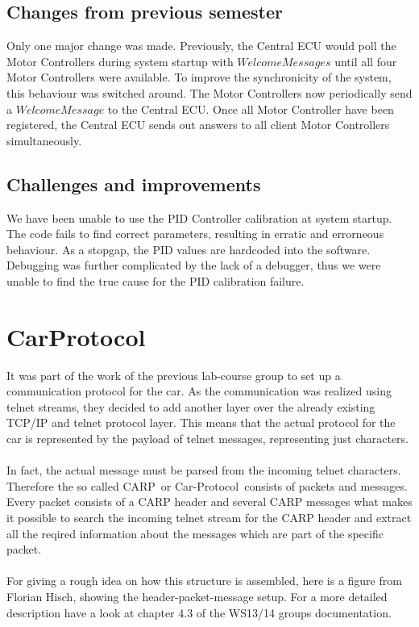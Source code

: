\subsection{Changes from previous semester}
Only one major change was made. Previously, the Central ECU would poll the Motor Controllers during system startup with $WelcomeMessages$ until all four Motor Controllers were available. To improve the synchronicity of the system, this behaviour was switched around. The Motor Controllers now periodically send a $WelcomeMessage$ to the Central ECU. Once all Motor Controller have been registered, the Central ECU sends out answers to all client Motor Controllers simultaneously.

\subsection{Challenges and improvements}
We have been unable to use the PID Controller calibration at system startup. The code fails to find correct parameters, resulting in erratic and errorneous behaviour. As a stopgap, the PID values are hardcoded into the software. Debugging was further complicated by the lack of a debugger, thus we were unable to find the true cause for the PID calibration failure.


\section{CarProtocol}
It was part of the work of the previous lab-course group to set up a communication protocol for the car. As the communication was realized using telnet streams, they decided to add another layer over the already existing TCP/IP and telnet protocol layer. This means that the actual protocol for the car is represented by the payload of telnet messages, representing just characters.
\\ \\
In fact, the actual message must be parsed from the incoming telnet  characters. Therefore the so called \glqq CARP\grqq \ or \glqq Car-Protocol\grqq \ consists of packets and messages. Every packet consists of a CARP header and several CARP messages what makes it possible to search the incoming telnet stream for the CARP header and extract all the reqired information about the messages which are part of the specific packet.
\\ \\
For giving a rough idea on how this structure is assembled, here is a figure from Florian Hisch, showing the header-packet-message setup. For a more detailed description have a look at chapter 4.3 of the WS13/14 groups documentation.

